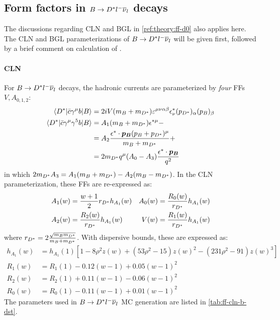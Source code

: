 \subsection{Form factors in $B \rightarrow {\ensuremath{{D}^*}}{\ensuremath{l^-}}{\ensuremath{{\overline{\nu}}_l}}$ decays}
\label{ref:theory:ff-dst}

The discussions regarding CLN and BGL in \cref{ref:theory:ff-d0} also applies
here.
The CLN and BGL parameterizations of $B \rightarrow {\ensuremath{{D}^*}}{\ensuremath{l^-}}{\ensuremath{{\overline{\nu}}_l}}$ will be
given first,
followed by a brief comment on calculation of \RDX.

\paragraph{CLN}
For $B \rightarrow {\ensuremath{{D}^*}}{\ensuremath{l^-}}{\ensuremath{{\overline{\nu}}_l}}$ decays,
the hadronic currents are parameterized by \emph{four} FFs $V, A_{0,1,2}$:
\begin{align}
    \langle{\ensuremath{{D}^*}}\rvert \bar{c} \gamma^\mu b \lvert B\rangle
    =\hphantom{ } &
        2i V (m_B + m_{{D}^*}) \varepsilon^{\mu\nu\alpha\beta}
        \epsilon^*_\nu (p_{{D}^*})_\alpha (p_B)_\beta \\
    \langle{\ensuremath{{D}^*}}\rvert \bar{c} \gamma^\mu \gamma^5 b \lvert B\rangle
    =\hphantom{ } &
        A_1 (m_B + m_{{D}^*}) \epsilon^{*\mu} -
        \nonumber \\
    =\hphantom{ } &
        A_2 \frac{\epsilon^* \cdot \bm{p_B} (p_B + p_{{D}^*})^\mu}{m_B + m_{{D}^*}} +
        \nonumber \\
    =\hphantom{ } &
        2 m_{{D}^*} q^\mu (A_0 - A_3) \frac{\epsilon^* \cdot \bm{p_B}}{q^2}
\end{align}
in which $2 m_{{D}^*} A_3 = A_1(m_B + m_{{D}^*}) - A_2(m_B - m_{{D}^*})$.
In the CLN parameterization,
these FFs are re-expressed as:
\begin{align}
    & A_1(w) = \frac{w+1}{2} r_{{D}^*} h_{A_1}(w)
    & A_0(w) = \frac{R_0(w)}{r_{{D}^*}} h_{A_1}(w)
    \label{eqn:b-dst-ff-param-1} \\
    & A_2(w) = \frac{R_2(w)}{r_{{D}^*}} h_{A_1}(w)
    & V(w) = \frac{R_1(w)}{r_{{D}^*}} h_{A_1}(w)
    \label{eqn:b-dst-ff-param-2}
\end{align}
where $r_{{D}^*} = 2 \frac{\sqrt{m_B m_{{D}^*}}}{m_B + m_{{D}^*}}$.
With dispersive bounds, these are expressed as:
\begin{align}
    h_{A_1}(w) &= h_{A_1}(1) \left[
        1 - 8 \rho^2 z(w) + (53 \rho^2 - 15) z(w)^2 - (231 \rho^2 - 91) z(w)^3
    \right] \\
    R_1(w) &= R_1(1) - 0.12(w-1) + 0.05(w-1)^2 \\
    R_2(w) &= R_2(1) + 0.11(w-1) - 0.06(w-1)^2 \\
    R_0(w) &= R_0(1) - 0.11(w-1) + 0.01(w-1)^2
\end{align}
The parameters used in $B \rightarrow {\ensuremath{{D}^*}}{\ensuremath{l^-}}{\ensuremath{{\overline{\nu}}_l}}$ MC generation are
listed in \cref{tab:ff-cln-b-dst}.

